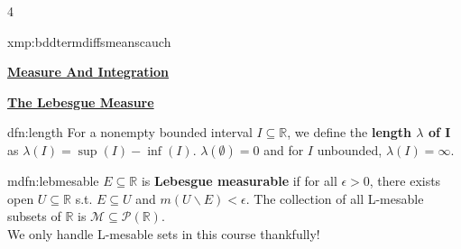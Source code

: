 \documentclass[landscape, 8pt]{extarticle}
\begin{document}
\begin{multicols*}{4}
\begin{xmp-s}{xmp:bddtermdiffsmeanscauch}{ }
		\end{xmp-s}
		
		
		
		
	\columnbreak
	
	
	
	\vspace*{-8pt}
	{\footnotesize \textbf{\underline{Measure And Integration}}}
	
	
	{\tiny\textbf{\underline{The Lebesgue Measure}}}
		
		
		
		\begin{dfn}[Length]{dfn:length}{ }
			For a nonempty bounded interval $I \subseteq \mathbb{R}$, we define the \textbf{length $\lambda$ of I} as $\lambda(I) = \sup(I) - \inf(I)$. $\lambda(\emptyset) = 0$ and for $I$ unbounded, $\lambda(I) = \infty$.
			
		\end{dfn}
		
		
		\begin{mdfn}{mdfn:lebmesable}{ }
			$E \subseteq \mathbb{R}$ is \textbf{Lebesgue measurable} if for all $\epsilon > 0$, there exists open $U \subseteq \mathbb{R}$ s.t. $E \subseteq U$ and $m(U \backslash E) <\epsilon$. The collection of all L-mesable subsets of $\mathbb{R}$ is $\mathcal{M} \subseteq \mathcal{P}(\mathbb{R})$.\\
			We only handle L-mesable sets in this course thankfully!
			
		\end{mdfn}
		

\end{multicols*}
\end{document}
